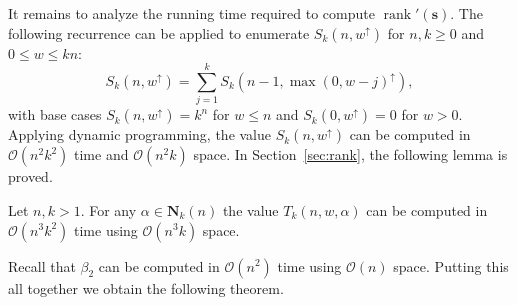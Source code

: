 \documentclass[US-letter,USenglish,authorcolumns,autoref]{lipics-v2021}
\renewcommand{\tt} {\mathtt}
\newcommand{\bS}{\mathbf{S}}
\newcommand{\bN}{\mathbf{N}}
\newcommand{\bp}{\mathbf{p}}
\newcommand{\bs}{\mathbf{s}}
\newenvironment{frshaded*}{%
    \def\FrameCommand{\fboxrule=\FrameRule\fboxsep=\FrameSep \fcolorbox{lipicsYellow}{shadecolor}}%
    \MakeFramed {\advance\hsize-\width \FrameRestore}}%
    {\endMakeFramed}
\newcounter{examplecounter}
\newenvironment{exam}{
 \begin{frshaded*}
    \refstepcounter{examplecounter}%
    \noindent
  \textbf{Example \arabic{examplecounter}}%
  \quad
}{%
\end{frshaded*}
}
\DeclareMathOperator{\wt}{weight}
\DeclareMathOperator{\rank}{rank}
\begin{document}
It remains to analyze the running time required to compute $\rank'(\bs)$.  The following recurrence can be applied to enumerate $S_k(n,w^\uparrow)$ for $n,k\geq 0$ and  $0 \leq w \leq kn$:
\begin{equation}
    S_k(n,w^\uparrow) = \sum_{j=1}^{k} S_k(n-1,\max(0,w-j)^\uparrow), 
\end{equation}
with base cases $S_k(n,w^\uparrow) = k^n$ for $w \leq n$ and $S_k(0,w^\uparrow) = 0$ for $w > 0$.
Applying dynamic programming, the value $S_k(n,w^\uparrow)$ can be computed in $\mathcal{O}(n^2k^2)$ time and   $\mathcal{O}(n^2k)$ space.   In Section~\ref{sec:rank}, the following lemma is proved.
%
\begin{lemma} \label{lem:T}
Let $n,k > 1$. For any $\alpha \in \bN_k(n)$ the value $T_k(n,w,\alpha)$ can be computed in $\mathcal{O}(n^3k^2)$ time using $\mathcal{O}(n^3k)$ space. 
\end{lemma}
%

\noindent
Recall that $\beta_2$ can be computed in $\mathcal{O}(n^2)$ time using $\mathcal{O}(n)$ space.  Putting this all together we obtain the following theorem.




%

%
\end{document}
